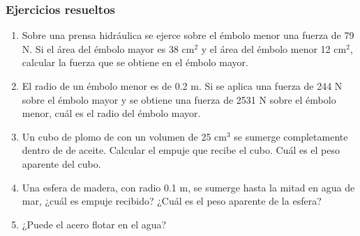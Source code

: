 \documentclass[handout]{beamer}
\begin{document}
\begin{frame}
\frametitle{Ejercicios resueltos}
\begin{enumerate}
\item Sobre una prensa hidráulica se ejerce sobre el émbolo menor una fuerza de 79 N. Si
  el área del émbolo mayor es 38 cm$^2$ y el área del émbolo menor 12 cm$^2$, calcular la
  fuerza que se obtiene en el émbolo mayor.
\item El radio de un émbolo menor es de 0.2 m. Si se aplica una fuerza de 244 N sobre el
  émbolo mayor y se obtiene una fuerza de 2531 N sobre el émbolo menor, cuál es el radio
  del émbolo mayor. 
\item Un cubo de plomo de con un volumen de 25 cm$^3$ se sumerge completamente dentro de
  de aceite. Calcular el empuje que recibe el cubo. Cuál es el peso aparente del cubo.
\item Una esfera de madera, con radio 0.1 m, se sumerge hasta la mitad en agua de mar, ¿cuál es empuje
  recibido? ¿Cuál es el peso aparente de la esfera?
\item ¿Puede el acero flotar en el agua?
\end{enumerate}
\end{frame}
\end{document}

